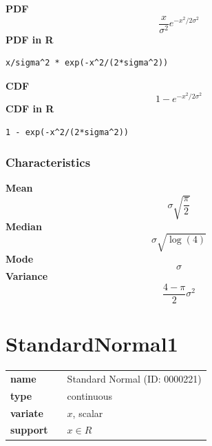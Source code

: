 \smallskip \noindent \hspace{.2cm} \textbf{PDF} 
\begin{equation*}\frac{x}{\sigma^2} e^{-x^2/2\sigma^2}\end{equation*}
\smallskip \noindent \hspace{.2cm} \textbf{PDF in R}  
\begin{verbatim}x/sigma^2 * exp(-x^2/(2*sigma^2))\end{verbatim}
\smallskip \noindent \hspace{.2cm} \textbf{CDF} 
\begin{equation*}1 - e^{-x^2/2\sigma^2}\end{equation*}
\smallskip \noindent \hspace{.2cm} \textbf{CDF in R} 
\begin{verbatim}1 - exp(-x^2/(2*sigma^2))\end{verbatim}
\smallskip
\subsubsection*{Characteristics}
\smallskip \noindent \hspace{.2cm} \textbf{Mean} 
\begin{equation*}\sigma \sqrt{\frac{\pi}{2}}\end{equation*}
\smallskip \noindent \hspace{.2cm} \textbf{Median} 
\begin{equation*}\sigma \sqrt{\log(4)}\end{equation*}
\smallskip \noindent \hspace{.2cm} \textbf{Mode} 
\begin{equation*}\sigma\end{equation*}
\smallskip \noindent \hspace{.2cm} \textbf{Variance} 
\begin{equation*}\frac{4 - \pi}{2} \sigma^2\end{equation*}
\smallskip
\section*{StandardNormal1}

  \bigskip 

\begin{tabular}{p{2cm}cl}
\textbf{name} & & Standard Normal (ID: 0000221)\\ 
 
\textbf{type} & & continuous \\ 

\textbf{variate} & & $x$, scalar \\ 

\textbf{support} & & $x \in R$
\end{tabular}

